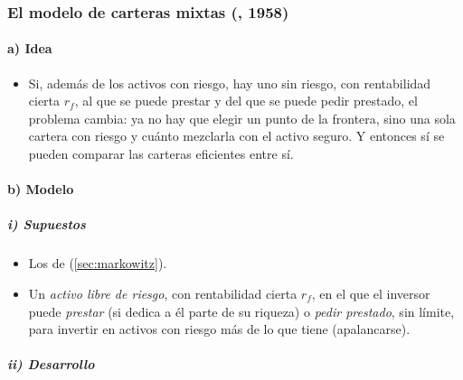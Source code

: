 \documentclass[11pt]{article}
\begin{document}
\subsubsection{El modelo de carteras mixtas (, 1958)}\label{sec:tobin}

\paragraph{a) Idea}

\begin{itemize}
\item Si, además de los activos con riesgo, hay uno sin riesgo, con rentabilidad cierta $r_f$, al que se puede prestar y del que se puede pedir prestado, el problema cambia: ya no hay que elegir un punto de la frontera, sino una sola cartera con riesgo y cuánto mezclarla con el activo seguro\nocite{Tobin1958Liquidity}. Y entonces sí se pueden comparar las carteras eficientes entre sí.
\end{itemize}

\paragraph{b) Modelo}

\subparagraph{i) Supuestos}

\begin{itemize}
\item Los de  (\ref{sec:markowitz}).
\item Un \emph{activo libre de riesgo}, con rentabilidad cierta $r_f$, en el que el inversor puede \emph{prestar} (si dedica a él parte de su riqueza) o \emph{pedir prestado}, sin límite, para invertir en activos con riesgo más de lo que tiene (apalancarse).
\end{itemize}

\subparagraph{ii) Desarrollo}
\end{document}
